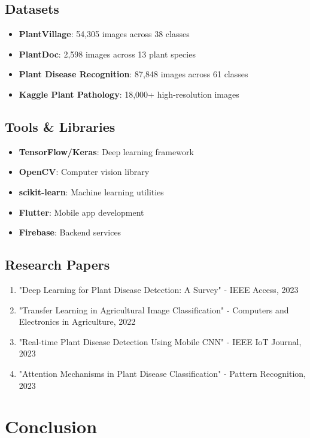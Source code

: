 \documentclass[12pt,a4paper]{article}
\begin{document}
\subsection{Datasets}
\begin{itemize}[leftmargin=2em]
    \item \textbf{PlantVillage}: 54,305 images across 38 classes
    \item \textbf{PlantDoc}: 2,598 images across 13 plant species
    \item \textbf{Plant Disease Recognition}: 87,848 images across 61 classes
    \item \textbf{Kaggle Plant Pathology}: 18,000+ high-resolution images
\end{itemize}

\subsection{Tools \& Libraries}
\begin{itemize}[leftmargin=2em]
    \item \textbf{TensorFlow/Keras}: Deep learning framework
    \item \textbf{OpenCV}: Computer vision library
    \item \textbf{scikit-learn}: Machine learning utilities
    \item \textbf{Flutter}: Mobile app development
    \item \textbf{Firebase}: Backend services
\end{itemize}

\subsection{Research Papers}
\begin{enumerate}[leftmargin=2em]
    \item "Deep Learning for Plant Disease Detection: A Survey" - IEEE Access, 2023
    \item "Transfer Learning in Agricultural Image Classification" - Computers and Electronics in Agriculture, 2022
    \item "Real-time Plant Disease Detection Using Mobile CNN" - IEEE IoT Journal, 2023
    \item "Attention Mechanisms in Plant Disease Classification" - Pattern Recognition, 2023
\end{enumerate}

\section{Conclusion}
\end{document}
